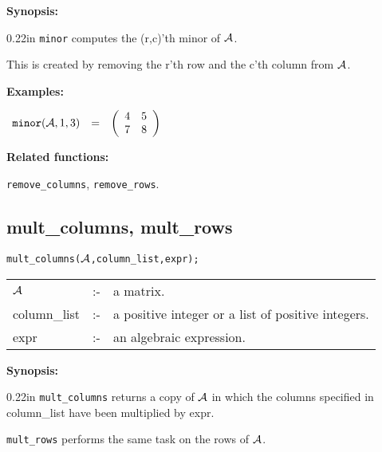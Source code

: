 {\bf Synopsis:} %

\begin{addtolength}{\leftskip}{0.22in}
                {\tt minor} computes the (r,c)'th minor of ${\cal A}$.

                This is created by removing the r'th row and the c'th
                column from ${\cal A}$.

\end{addtolength}

{\bf Examples:}

\begin{flushleft}
\hspace*{0.1in}
\begin{math}
\begin{array}{ccc}
{\tt minor}({\cal A},1,3) & = &
        \left( \begin{array}{cc} 4 & 5 \\ 7 & 8
 \end{array} \right)
\end{array}
\end{math}
\end{flushleft}

{\bf Related functions:}

\hspace*{0.175in} {\tt remove\_columns}, {\tt remove\_rows}.


\subsection{mult\_columns, mult\_rows}


\hspace*{0.175in} {\tt mult\_columns(${\cal A}$,column\_list,expr);}

\hspace*{0.1in}
\begin{tabular}{l l l}
${\cal A}$   &:-& a matrix. \\
column\_list &:-& a positive integer or a list of positive integers. \\
expr        &:-& an algebraic expression.
\end{tabular}

{\bf Synopsis:} %

\begin{addtolength}{\leftskip}{0.22in}
{\tt mult\_columns} returns a copy of ${\cal A}$ in which
                the columns specified in column\_list have been
multiplied by expr.

{\tt mult\_rows} performs the same task on the rows of ${\cal A}$.

\end{addtolength}

